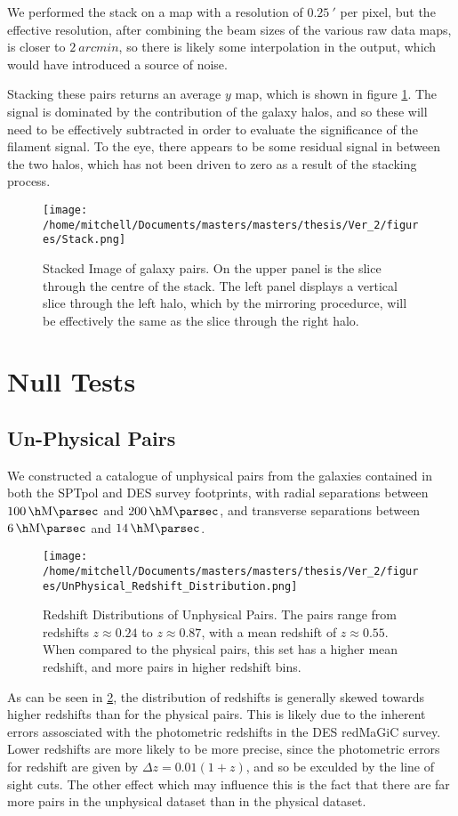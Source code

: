 We performed the stack on a map with a resolution of $\SI{0.25}{\arcmin}$ per pixel, but the effective resolution, after combining the beam sizes of the various raw data maps, is closer to $\SI{2}{arcmin}$, so there is likely some interpolation in the output, which would have introduced a source of noise.


Stacking these pairs returns an average $y$ map, which is shown in figure \ref{fig:physical:stack}. The signal is dominated by the contribution of the galaxy halos, and so these will need to be effectively subtracted in order to evaluate the significance of the filament signal. To the eye, there appears to be some residual signal in between the two halos, which has not been driven to zero as a result of the stacking process. 


\begin{figure}[h!]
\centering
\texttt{[image: /home/mitchell/Documents/masters/masters/thesis/Ver\_2/figures/Stack.png]}
\caption{Stacked Image of galaxy pairs. On the upper panel is the slice through the centre of the stack. The left panel displays a vertical slice through the left halo, which by the mirroring procedurce, will be effectively the same as the slice through the right halo.}
\label{fig:physical:stack}
\end{figure}


\section{Null Tests}
\subsection{Un-Physical Pairs}
We constructed a catalogue of unphysical pairs from the galaxies contained in both the SPTpol and DES survey footprints, with radial separations between $\SI{100}{\per\h\mega\parsec}$ and $\SI{200}{\per\h\mega\parsec}$, and transverse separations between $\SI{6}{\per\h\mega\parsec}$ and $\SI{14}{\per\h\mega\parsec}$. 

\begin{figure}[h!]
\centering
\texttt{[image: /home/mitchell/Documents/masters/masters/thesis/Ver\_2/figures/UnPhysical\_Redshift\_Distribution.png]}
\caption{Redshift Distributions of Unphysical Pairs. The pairs range from redshifts $z\approx0.24$ to $z\approx0.87$, with a mean redshift of $z\approx0.55$. When compared to the physical pairs, this set has a higher mean redshift, and more pairs in higher redshift bins.   }
\label{fig:unphysical:redshifts}
\end{figure}
As can be seen in \ref{fig:unphysical:redshifts}, the distribution of redshifts is generally skewed towards higher redshifts than for the physical pairs. This is likely due to the inherent errors assosciated with the photometric redshifts in the DES redMaGiC survey. Lower redshifts are more likely to be more precise, since the photometric errors for redshift are given by $\Delta z= 0.01(1+z)$, and so be exculded by the line of sight cuts. The other effect which may influence this is the fact that there are far more pairs in the unphysical dataset than in the physical dataset. 


